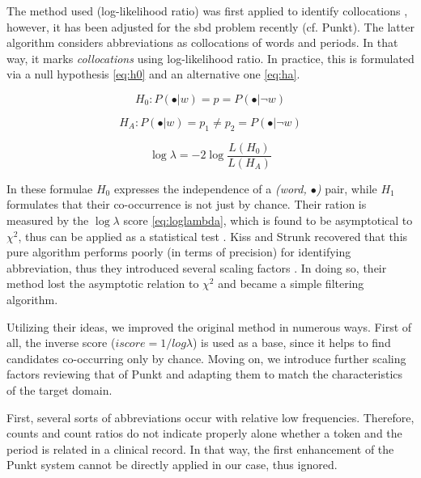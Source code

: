 The method used (log-likelihood ratio) was first applied to identify collocations \cite{dunning1993accurate}, however, it has been adjusted for the \acrshort{sbd} problem recently (cf. Punkt\cite{kiss2006unsupervised}). 
The latter algorithm considers abbreviations as collocations of words and periods. 
In that way, it marks \textit{collocations} using log-likelihood ratio.
In practice, this is formulated via a null hypothesis \eqref{eq:h0} and an alternative one \eqref{eq:ha}. 

\begin{equation} \label{eq:h0}
H_0: P(\bullet|w) = p = P(\bullet|\neg w)
\end{equation}

\begin{equation} \label{eq:ha}
H_A: P(\bullet|w) = p_1 \neq p_2 = P(\bullet|\neg w) 
\end{equation}

\begin{equation} \label{eq:loglambda}
\log \lambda = -2 \log \frac{L(H_0)}{L(H_A)}
\end{equation}


In these formulae $H_0$ expresses the independence of a \emph{(word, $\bullet$)} pair, while $H_1$ formulates that their co-occurrence is not just by chance. 
Their ration is measured by the $\log \lambda$ score \eqref{eq:loglambda}, which is found to be asymptotical to $\chi^2$, thus   can be applied as a statistical test \cite{dunning1993accurate}. 
Kiss and Strunk recovered that this pure algorithm performs poorly (in terms of precision) for identifying abbreviation, thus they introduced several scaling factors \cite{kiss2006unsupervised}. 
In doing so, their method lost the asymptotic relation to $\chi^2$ and became a simple filtering algorithm.

Utilizing their ideas, we improved the original method in numerous ways. 
First of all, the inverse score ($iscore=1/log\lambda$) is used as a base, since it helps to find candidates co-occurring only by chance. 
Moving on, we introduce further scaling factors reviewing that of Punkt and adapting them to match the characteristics of the target domain.

First, several sorts of abbreviations occur with relative low frequencies. Therefore, counts and count ratios do not indicate properly alone whether a token and the period is related in a clinical record. 
In that way, the first enhancement of the Punkt system cannot be directly applied in our case, thus ignored. 

